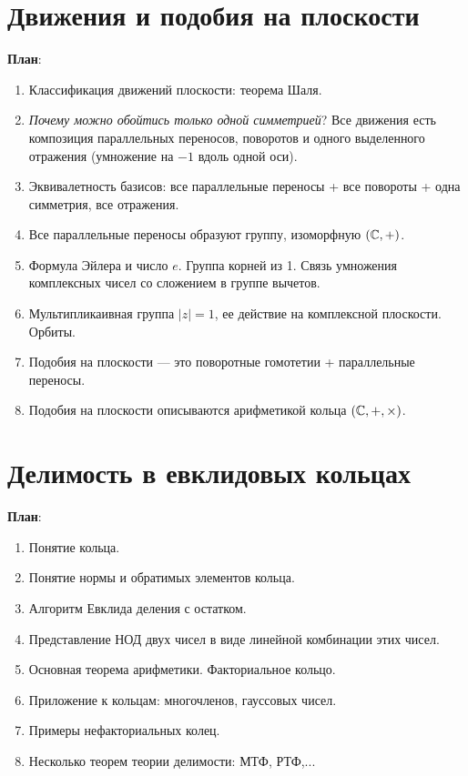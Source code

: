 \section{Движения и подобия на плоскости}


\textbf{План}:
\begin{enumerate}
\item Классификация движений плоскости: теорема Шаля.
\item \textit{Почему можно обойтись только одной симметрией}? Все движения есть композиция параллельных переносов, поворотов и одного выделенного отражения (умножение на $-1$ вдоль одной оси).
\item Эквивалетность базисов: все параллельные переносы + все повороты + одна симметрия, все отражения.
\item Все параллельные переносы образуют группу, изоморфную $(\mathbb C,+)$.
\item Формула Эйлера и число $e$. Группа корней из 1. Связь умножения комплексных чисел со сложением в группе вычетов.
\item Мультипликаивная группа $|z|=1$, ее действие на комплексной плоскости. Орбиты.
\item Подобия на плоскости --- это поворотные гомотетии + параллельные переносы.
\item Подобия на плоскости описываются арифметикой кольца $(\mathbb C,+,\times)$.
\end{enumerate}



\section{Делимость в евклидовых кольцах}


\textbf{План}:
\begin{enumerate}
\item Понятие кольца.
\item Понятие нормы и обратимых элементов кольца.
\item Алгоритм Евклида деления с остатком.
\item Представление НОД двух чисел в виде линейной комбинации этих чисел.
\item Основная теорема арифметики. Факториальное кольцо.
\item Приложение к кольцам: многочленов, гауссовых чисел.
\item Примеры нефакториальных колец.
\item Несколько теорем теории делимости: МТФ, РТФ,...
\end{enumerate}














